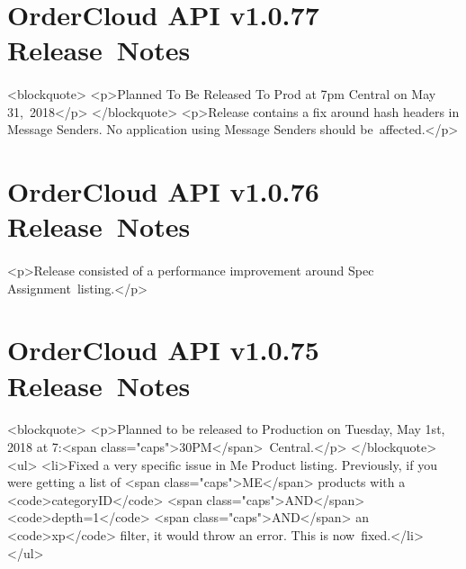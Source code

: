 \documentclass{memoir}%
\begin{document}
%
\section*{OrderCloud API v1.0.77 Release~Notes}%
\paragraph*{}%

%
\paragraph*{}%
<blockquote>\newline%
<p>Planned To Be Released To Prod at 7pm Central on May 31,~2018</p>\newline%
</blockquote>\newline%
<p>Release contains a fix around hash headers in Message Senders. No application using Message Senders should be~affected.</p>

%
\section*{OrderCloud API v1.0.76 Release~Notes}%
\paragraph*{}%

%
\paragraph*{}%
<p>Release consisted of a performance improvement around Spec Assignment~listing.</p>

%
\section*{OrderCloud API v1.0.75 Release~Notes}%
\paragraph*{}%

%
\paragraph*{}%
<blockquote>\newline%
<p>Planned to be released to Production on Tuesday, May 1st, 2018 at 7:<span class="caps">30PM</span>~Central.</p>\newline%
</blockquote>\newline%
<ul>\newline%
<li>Fixed a very specific issue in Me Product listing. Previously, if you were getting a list of <span class="caps">ME</span> products with a <code>categoryID</code> <span class="caps">AND</span> <code>depth=1</code> <span class="caps">AND</span> an <code>xp</code> filter, it would throw an error. This is now~fixed.</li>\newline%
</ul>
\end{document}
